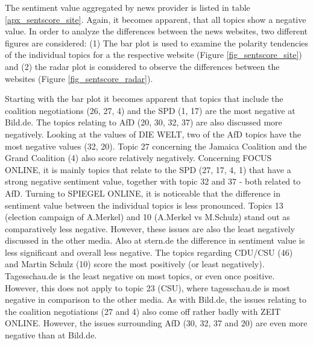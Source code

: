 \documentclass[12pt,a4paper,notitlepage]{article}
\begin{document}
The sentiment value aggregated by news provider is listed in table \ref{apx_sentscore_site}. Again, it becomes apparent, that all topics show a negative value. In order to analyze the differences between the news websites, two different figures are considered: (1) The bar plot is used to examine the polarity tendencies of the individual topics for a the respective website (Figure \ref{fig_sentscore_site}) and (2) the radar plot is considered to observe the differences between the websites (Figure \ref{fig_sentscore_radar}).

Starting with the bar plot it becomes apparent that  topics that include the coalition negotiations (26, 27, 4) and the SPD (1, 17) are the most negative at Bild.de. The topics relating to AfD (20, 30, 32, 37) are also discussed more negatively. Looking at the values of DIE WELT, two of the AfD topics have the most negative values (32, 20). Topic 27 concerning the Jamaica Coalition and the Grand Coalition (4) also score relatively negatively. Concerning FOCUS ONLINE, it is mainly topics that relate to the SPD (27, 17, 4, 1) that have a strong negative sentiment value, together with topic 32 and 37 - both related to AfD. Turning to SPIEGEL ONLINE, it is noticeable that the difference in sentiment value between the individual topics is less pronounced. Topics 13 (election campaign of A.Merkel) and 10 (A.Merkel vs M.Schulz) stand out as comparatively less negative. However, these issues are also the least negatively discussed in the other media. Also at stern.de the difference in sentiment value is less significant and overall less negative. The topics regarding CDU/CSU (46) and Martin Schulz (10) score the most positively (or least negatively). Tagesschau.de is the least negative on most topics, or even once positive. However, this does not apply to topic 23 (CSU), where tagesschau.de is most negative in comparison to the other media. As with Bild.de, the issues relating to the coalition negotiations (27 and 4) also come off rather badly with ZEIT ONLINE. However, the issues surrounding AfD (30, 32, 37 and 20) are even more negative than at Bild.de. 
\end{document}
